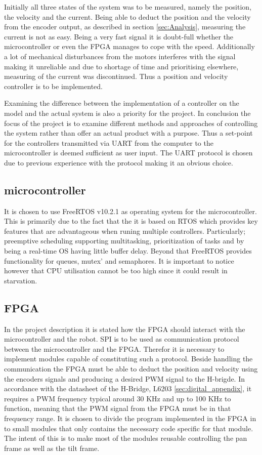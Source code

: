 \documentclass[../../main.tex]{subfiles}
\begin{document}
Initially all three states of the system was to be measured, namely the position, the velocity and the current. Being able to deduct the position and the velocity from the encoder output, as described in section \ref{sec:Analysis}, measuring the current is not as easy. Being a very fast signal it is doubt-full whether the microcontroller or even the FPGA manages to cope with the speed. Additionally a lot of mechanical disturbances from the motors interferes with the signal making it unreliable and due to shortage of time and prioritising elsewhere, measuring of the current was discontinued. Thus a position and velocity controller is to be implemented.

Examining the difference between the implementation of a controller on the model and the actual system is also a priority for the project. In conclusion the focus of the project is to examine different methods and approaches of controlling the system rather than offer an actual product with a purpose. Thus a set-point for the controllers transmitted via UART from the computer to the microcontroller is deemed sufficient as user input. The UART protocol is chosen due to previous experience with the protocol making it an obvious choice. 



\subsection*{microcontroller}
It is chosen to use FreeRTOS v10.2.1 as operating system for the microcontroller. This is primarily due to the fact that the it is based on RTOS which provides key features that are advantageous when runing multiple controllers. Particularly; preemptive scheduling supporting multitasking, prioritization of tasks and by being a real-time OS having little buffer delay. Beyond that FreeRTOS provides functionality for queues, mutex' and semaphores. It is important to notice however that CPU utilisation cannot be too high since it could result in starvation.


\subsection*{FPGA}
In the project description it is stated how the FPGA should interact with the microcontroller and the robot.
SPI is to be used as communication protocol between the microcontroller and the FPGA. Therefor it is necessary to implement modules capable of constituting such a protocol. Beside handling the communication the FPGA must be able to deduct the position and velocity using the encoders signals and producing a desired PWM signal to the H-brigde. In accordance with the datasheet of the H-Bridge, L6203 \ref{sec:digital_appendix}, it requires a PWM frequency typical around 30 KHz and up to 100 KHz to function, meaning that the PWM signal from the FPGA must be in that frequency range. 
It is chosen to divide the program implemented in the FPGA in to small modules that only contains the necessary code specific for that module. The intent of this is to make most of the modules reusable controlling the pan frame as well as the tilt frame.
\end{document}
